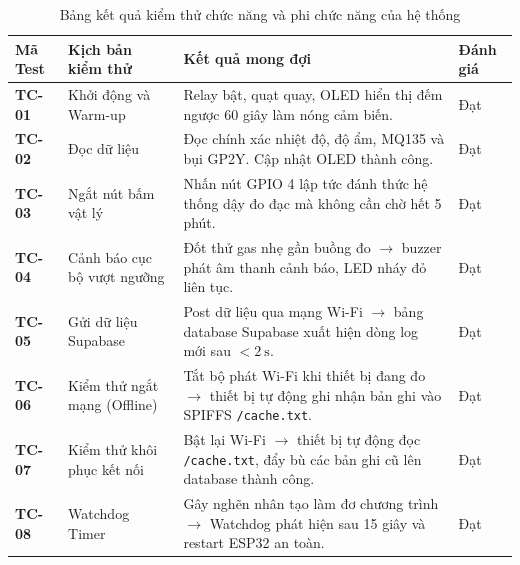 \begin{table}[H]
\centering
\caption{Bảng kết quả kiểm thử chức năng và phi chức năng của hệ thống}
\label{tab:testcases}
\small
\renewcommand{\arraystretch}{1.35}
\setlength{\tabcolsep}{5pt}

\begin{tabularx}{\textwidth}{|p{1.8cm}|p{3.6cm}|X|p{1.5cm}|}
\hline
\textbf{Mã Test} 
& \textbf{Kịch bản kiểm thử} 
& \textbf{Kết quả mong đợi} 
& \textbf{Đánh giá} \\
\hline

\textbf{TC-01} 
& Khởi động và Warm-up 
& Relay bật, quạt quay, OLED hiển thị đếm ngược 60 giây làm nóng cảm biến. 
& Đạt \\
\hline

\textbf{TC-02} 
& Đọc dữ liệu 
& Đọc chính xác nhiệt độ, độ ẩm, MQ135 và bụi GP2Y. Cập nhật OLED thành công. 
& Đạt \\
\hline

\textbf{TC-03} 
& Ngắt nút bấm vật lý 
& Nhấn nút GPIO 4 lập tức đánh thức hệ thống dậy đo đạc mà không cần chờ hết 5 phút. 
& Đạt \\
\hline

\textbf{TC-04} 
& Cảnh báo cục bộ vượt ngưỡng 
& Đốt thử gas nhẹ gần buồng đo $\rightarrow$ buzzer phát âm thanh cảnh báo, LED nháy đỏ liên tục. 
& Đạt \\
\hline

\textbf{TC-05} 
& Gửi dữ liệu Supabase 
& Post dữ liệu qua mạng Wi-Fi $\rightarrow$ bảng database Supabase xuất hiện dòng log mới sau $< 2~\mathrm{s}$. 
& Đạt \\
\hline

\textbf{TC-06} 
& Kiểm thử ngắt mạng (Offline) 
& Tắt bộ phát Wi-Fi khi thiết bị đang đo $\rightarrow$ thiết bị tự động ghi nhận bản ghi vào SPIFFS \texttt{/cache.txt}. 
& Đạt \\
\hline

\textbf{TC-07} 
& Kiểm thử khôi phục kết nối 
& Bật lại Wi-Fi $\rightarrow$ thiết bị tự động đọc \texttt{/cache.txt}, đẩy bù các bản ghi cũ lên database thành công. 
& Đạt \\
\hline

\textbf{TC-08} 
& Watchdog Timer 
& Gây nghẽn nhân tạo làm đơ chương trình $\rightarrow$ Watchdog phát hiện sau 15 giây và restart ESP32 an toàn. 
& Đạt \\
\hline

\end{tabularx}
\end{table}

